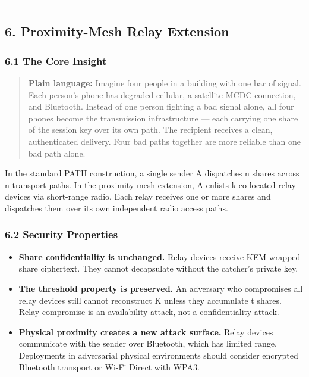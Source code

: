 \documentclass[
  11pt,
]{article}
\providecommand{\tightlist}{%
  \setlength{\itemsep}{0pt}\setlength{\parskip}{0pt}}
\begin{document}
\begin{center}\rule{0.5\linewidth}{0.5pt}\end{center}

\hypertarget{proximity-mesh-relay-extension}{%
\subsection{6. Proximity-Mesh Relay
Extension}\label{proximity-mesh-relay-extension}}

\hypertarget{the-core-insight}{%
\subsubsection{6.1 The Core Insight}\label{the-core-insight}}

\begin{quote}
\textbf{Plain language:} Imagine four people in a building with one bar
of signal. Each person's phone has degraded cellular, a satellite MCDC
connection, and Bluetooth. Instead of one person fighting a bad signal
alone, all four phones become the transmission infrastructure --- each
carrying one share of the session key over its own path. The recipient
receives a clean, authenticated delivery. Four bad paths together are
more reliable than one bad path alone.
\end{quote}

In the standard PATH construction, a single sender A dispatches n shares
across n transport paths. In the proximity-mesh extension, A enlists k
co-located relay devices via short-range radio. Each relay receives one
or more shares and dispatches them over its own independent radio access
paths.

\hypertarget{security-properties}{%
\subsubsection{6.2 Security Properties}\label{security-properties}}

\begin{itemize}
\tightlist
\item
  \textbf{Share confidentiality is unchanged.} Relay devices receive
  KEM-wrapped share ciphertext. They cannot decapsulate without the
  catcher's private key.
\item
  \textbf{The threshold property is preserved.} An adversary who
  compromises all relay devices still cannot reconstruct K unless they
  accumulate t shares. Relay compromise is an availability attack, not a
  confidentiality attack.
\item
  \textbf{Physical proximity creates a new attack surface.} Relay
  devices communicate with the sender over Bluetooth, which has limited
  range. Deployments in adversarial physical environments should
  consider encrypted Bluetooth transport or Wi-Fi Direct with WPA3.
\end{itemize}
\end{document}
